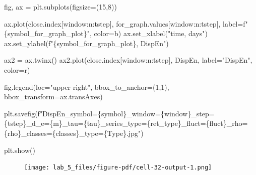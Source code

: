 \documentclass[
  letterpaper,
]{report}
\newenvironment{Shaded}{\begin{snugshade}}{\end{snugshade}}
\newcommand{\DecValTok}[1]{\textcolor[rgb]{0.68,0.00,0.00}{#1}}
\newcommand{\NormalTok}[1]{\textcolor[rgb]{0.00,0.23,0.31}{#1}}
\newcommand{\OperatorTok}[1]{\textcolor[rgb]{0.37,0.37,0.37}{#1}}
\newcommand{\SpecialCharTok}[1]{\textcolor[rgb]{0.37,0.37,0.37}{#1}}
\newcommand{\SpecialStringTok}[1]{\textcolor[rgb]{0.13,0.47,0.30}{#1}}
\newcommand{\StringTok}[1]{\textcolor[rgb]{0.13,0.47,0.30}{#1}}
\begin{document}
\begin{Shaded}
\begin{Highlighting}[]
\NormalTok{fig, ax }\OperatorTok{=}\NormalTok{ plt.subplots(figsize}\OperatorTok{=}\NormalTok{(}\DecValTok{15}\NormalTok{,}\DecValTok{8}\NormalTok{))}

\NormalTok{ax.plot(close.index[window:n:tstep], for\_graph.values[window:n:tstep], label}\OperatorTok{=}\SpecialStringTok{f"}\SpecialCharTok{\{}\NormalTok{symbol\_for\_graph\_plot}\SpecialCharTok{\}}\SpecialStringTok{"}\NormalTok{, color}\OperatorTok{=}\StringTok{\textquotesingle{}b\textquotesingle{}}\NormalTok{)}
\NormalTok{ax.set\_xlabel(}\StringTok{"time, days"}\NormalTok{)}
\NormalTok{ax.set\_ylabel(}\SpecialStringTok{f"}\SpecialCharTok{\{}\NormalTok{symbol\_for\_graph\_plot}\SpecialCharTok{\}}\SpecialStringTok{, DispEn"}\NormalTok{)}

\NormalTok{ax2 }\OperatorTok{=}\NormalTok{ ax.twinx()}
\NormalTok{ax2.plot(close.index[window:n:tstep], DispEn, label}\OperatorTok{=}\StringTok{"DispEn"}\NormalTok{, color}\OperatorTok{=}\StringTok{\textquotesingle{}r\textquotesingle{}}\NormalTok{)}

\NormalTok{fig.legend(loc}\OperatorTok{=}\StringTok{"upper right"}\NormalTok{, bbox\_to\_anchor}\OperatorTok{=}\NormalTok{(}\DecValTok{1}\NormalTok{,}\DecValTok{1}\NormalTok{), bbox\_transform}\OperatorTok{=}\NormalTok{ax.transAxes)}

\NormalTok{plt.savefig(}\SpecialStringTok{f"DispEn\_symbol=}\SpecialCharTok{\{}\NormalTok{symbol}\SpecialCharTok{\}}\SpecialStringTok{\_window=}\SpecialCharTok{\{}\NormalTok{window}\SpecialCharTok{\}}\SpecialStringTok{\_step=}\SpecialCharTok{\{}\NormalTok{tstep}\SpecialCharTok{\}}\SpecialStringTok{\_d\_e=}\SpecialCharTok{\{}\NormalTok{m}\SpecialCharTok{\}}\SpecialStringTok{\_tau=}\SpecialCharTok{\{}\NormalTok{tau}\SpecialCharTok{\}}\SpecialStringTok{\_series\_type=}\SpecialCharTok{\{}\NormalTok{ret\_type}\SpecialCharTok{\}}\SpecialStringTok{\_fluct=}\SpecialCharTok{\{}\NormalTok{fluct}\SpecialCharTok{\}}\SpecialStringTok{\_rho=}\SpecialCharTok{\{}\NormalTok{rho}\SpecialCharTok{\}}\SpecialStringTok{\_classes=}\SpecialCharTok{\{}\NormalTok{classes}\SpecialCharTok{\}}\SpecialStringTok{\_type=}\SpecialCharTok{\{}\NormalTok{Type}\SpecialCharTok{\}}\SpecialStringTok{.jpg"}\NormalTok{)}

\NormalTok{plt.show()}
\end{Highlighting}
\end{Shaded}

\begin{figure}[H]

{\centering \texttt{[image: lab\_5\_files/figure-pdf/cell-32-output-1.png]}

}

\end{figure}
\end{document}
